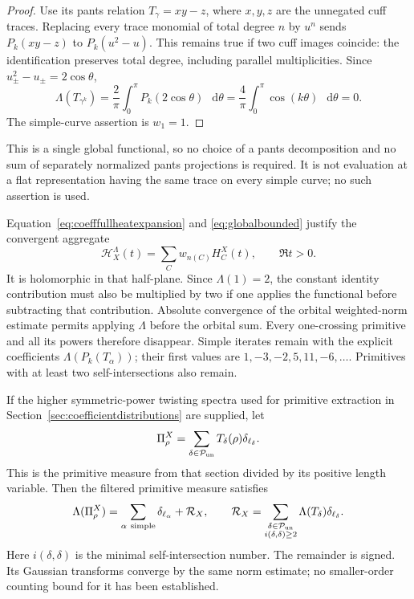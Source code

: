 \documentclass[11pt,a4paper]{article}
\numberwithin{equation}{section}
\theoremstyle{definition}
\theoremstyle{remark}
\newcommand{\dd}{\mathop{}\!\mathrm d}
\begin{document}
\begin{proof}
Use its pants relation $T_\gamma=xy-z$, where $x,y,z$ are the
unnegated cuff traces. Replacing every trace monomial of total
degree $n$ by $u^n$ sends $P_k(xy-z)$ to $P_k(u^2-u)$.
This remains true if two cuff images coincide: the identification
preserves total degree, including parallel multiplicities. Since
$u_\pm^2-u_\pm=2\cos\theta$,
\[
 \Lambda(T_{\gamma^k})
 =\frac2\pi\int_0^\pi P_k(2\cos\theta)\,\dd\theta
 =\frac4\pi\int_0^\pi\cos(k\theta)\,\dd\theta=0.
\]
The simple-curve assertion is $w_1=1$.
\end{proof}

This is a single global functional, so no choice of a pants
decomposition and no sum of separately normalized pants projections
is required. It is not evaluation at a flat representation having
the same trace on every simple curve; no such assertion is used.

Equation~\eqref{eq:coefffullheatexpansion} and
\eqref{eq:globalbounded} justify the convergent aggregate
\begin{equation}
 \mathcal H_X^\Lambda(t)=\sum_C w_{n(C)}H_C^X(t),
 \qquad \Re t>0.
 \label{eq:globalfilteredheat}
\end{equation}
It is holomorphic in that half-plane. Since $\Lambda(1)=2$, the
constant identity contribution must also be multiplied by two if
one applies the functional before subtracting that contribution.
Absolute convergence of the
orbital weighted-norm estimate permits applying $\Lambda$ before
the orbital sum. Every one-crossing primitive and all its powers
therefore disappear. Simple iterates remain with the explicit
coefficients $\Lambda(P_k(T_\alpha))$; their first values are
$1,-3,-2,5,11,-6,\ldots$. Primitives with at least two
self-intersections also remain.

If the higher symmetric-power twisting spectra used for primitive
extraction in Section~\ref{sec:coefficientdistributions} are supplied,
let
\[
 \Pi_\rho^X=\sum_{\delta\in\mathcal P_{\rm un}}
                T_\delta(\rho)\delta_{\ell_\delta}.
\]
This is the primitive measure from that section divided by its
positive length variable. Then the filtered primitive measure satisfies
\begin{equation}
 \Lambda(\Pi_\rho^X)
 =\sum_{\alpha\ {\rm simple}}\delta_{\ell_\alpha}
      +\mathcal R_X,
 \qquad
 \mathcal R_X=
 \sum_{\substack{\delta\in\mathcal P_{\rm un}\\i(\delta,\delta)\geq2}}
      \Lambda(T_\delta)\delta_{\ell_\delta}.
 \label{eq:globalresidual}
\end{equation}
Here $i(\delta,\delta)$ is the minimal self-intersection number.
The remainder is signed. Its Gaussian transforms converge by the
same norm estimate; no smaller-order counting bound for it has
been established.
\end{document}
